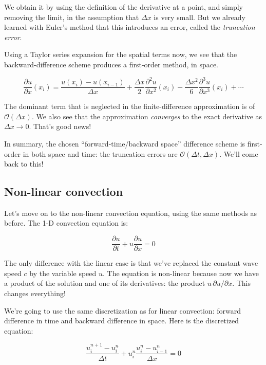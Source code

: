 \documentclass{article}
\begin{document}
We obtain it by using the definition of the derivative at a point, and
simply removing the limit, in the assumption that \(\Delta x\) is very
small. But we already learned with Euler's method that this introduces
an error, called the \emph{truncation error}.

Using a Taylor series expansion for the spatial terms now, we see that
the backward-difference scheme produces a first-order method, in space.

    \begin{equation}
\frac{\partial u}{\partial x}(x_i) = \frac{u(x_i)-u(x_{i-1})}{\Delta x} + \frac{\Delta x}{2} \frac{\partial^2 u}{\partial x^2}(x_i) - \frac{\Delta x^2}{6} \frac{\partial^3 u}{\partial x^3}(x_i)+ \cdots
\end{equation}

The dominant term that is neglected in the finite-difference
approximation is of \(\mathcal{O}(\Delta x)\). We also see that the
approximation \emph{converges} to the exact derivative as
\(\Delta x \rightarrow 0\). That's good news!

In summary, the chosen ``forward-time/backward space'' difference scheme
is first-order in both space and time: the truncation errors are
\(\mathcal{O}(\Delta t, \Delta x)\). We'll come back to this!

    \subsection{Non-linear convection}\label{non-linear-convection}

    Let's move on to the non-linear convection equation, using the same
methods as before. The 1-D convection equation is:

\begin{equation}\frac{\partial u}{\partial t} + u \frac{\partial u}{\partial x} = 0\end{equation}

The only difference with the linear case is that we've replaced the
constant wave speed \(c\) by the variable speed \(u\). The equation is
non-linear because now we have a product of the solution and one of its
derivatives: the product \(u\,\partial u/\partial x\). This changes
everything!

We're going to use the same discretization as for linear convection:
forward difference in time and backward difference in space. Here is the
discretized equation:

\begin{equation}\frac{u_i^{n+1}-u_i^n}{\Delta t} + u_i^n \frac{u_i^n-u_{i-1}^n}{\Delta x} = 0\end{equation}
\end{document}
